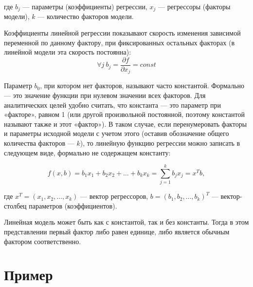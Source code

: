 \documentclass[a4paper,14pt]{article}
\begin{document}
где $b_j$ — параметры (коэффициенты) регрессии, $x_j$ — регрессоры (факторы модели), $k$ — количество факторов модели.

Коэффициенты линейной регрессии показывают скорость изменения зависимой переменной по данному фактору, при фиксированных остальных факторах (в линейной модели эта скорость постоянна):
\begin{equation}
\forall j ~b_j=\frac {\partial f}{\partial x_j}=const
\end{equation}

Параметр $b_0$, при котором нет факторов, называют часто константой. Формально — это значение функции при нулевом значении всех факторов. Для аналитических целей удобно считать, что константа — это параметр при «факторе», равном 1 (или другой произвольной постоянной, поэтому константой называют также и этот «фактор»). В таком случае, если перенумеровать факторы и параметры исходной модели с учетом этого (оставив обозначение общего количества факторов — $k$), то линейную функцию регрессии можно записать в следующем виде, формально не содержащем константу:

$$f(x,b)=b_1 x_1 + b_2 x_2 + \ldots + b_k x_k=\sum^k_{j=1}b_j x_j=x^Tb,$$

где $x^T=(x_1,x_2,\ldots,x_k)$ — вектор регрессоров, $b=(b_1,b_2, \ldots,b_k)^T$ — вектор-столбец параметров (коэффициентов).

Линейная модель может быть как с константой, так и без константы. Тогда в этом представлении первый фактор либо равен единице, либо является обычным фактором соответственно.

\section{Пример}
\end{document}
